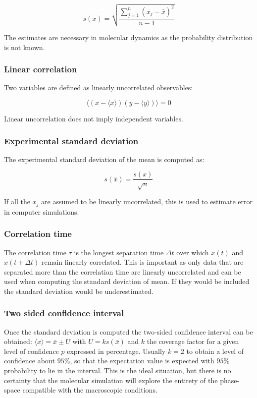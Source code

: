 		$$s(x) = \sqrt{\frac{\sum\limits_{j=1}^n(x_j-\bar{x})^2}{n-1}}$$

		The estimates are necessary in molecular dynamics as the probability distribution is not known.

		\subsubsection{Linear correlation}
		Two variables are defined as linearly uncorrelated observables:

		$$\bigl\langle(x-\langle x\rangle)(y-\langle y\rangle)\bigr\rangle = 0$$

		Linear uncorrelation does not imply independent variables.

		\subsubsection{Experimental standard deviation}
		The experimental standard deviation of the mean is computed as:

		$$s(\bar{x}) = \frac{s(x)}{\sqrt{n}}$$

		If all the $x_j$ are assumed to be linearly uncorrelated, this is used to estimate error in computer simulations.

		\subsubsection{Correlation time}
		The correlation time $\tau$ is the longest separation time $\Delta t$ over which $x(t)$ and $x(t + \Delta t)$ remain linearly correlated.
		This is important as only data that are separated more than the correlation time are linearly uncorrelated and can be used when computing the standard deviation of mean.
		If they would be included the standard deviation would be underestimated.

		\subsubsection{Two sided confidence interval}
		Once the standard deviation is computed the two-sided confidence interval can be obtained: $\langle x\rangle = \bar{x} \pm U$ with $U = ks(\bar{x})$ and $k$ the coverage factor for a given level of confidence $p$ expressed in percentage.
		Usually $k=2$ to obtain a level of confidence about $95\%$, so that the expectation value is expected with $95\%$ probability to lie in the interval.
		This is the ideal situation, but there is no certainty that the molecular simulation will explore the entirety of the phase-space compatible with the macroscopic conditions.

